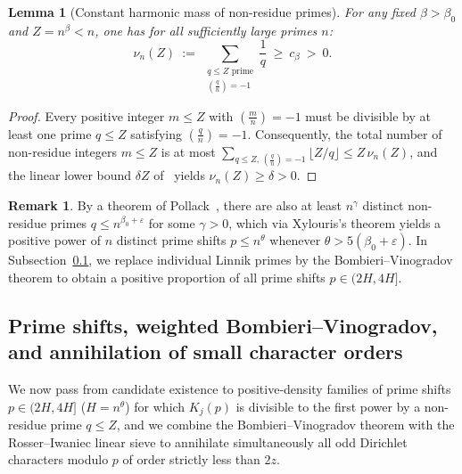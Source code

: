 \documentclass[11pt, a4paper]{article}
\theoremstyle{plain}
\newtheorem{lemma}[theorem]{Lemma}
\theoremstyle{definition}
\newtheorem{remark}[theorem]{Remark}
\newcommand{\leg}[2]{\left(\frac{#1}{#2}\right)}
\begin{document}
\begin{lemma}[Constant harmonic mass of non-residue primes]\label{aud:nu}
For any fixed $\beta>\beta_0$ and $Z=n^{\beta}<n$, one has for all sufficiently large primes $n$:
\[
\nu_n(Z)\ :=\ \sum_{\substack{q\le Z\text{ prime}\\ \leg{q}{n}=-1}}\frac{1}{q}\ \ge\ c_{\beta}\ >\ 0.
\]
\end{lemma}
\begin{proof}
Every positive integer $m\le Z$ with $\leg{m}{n}=-1$ must be divisible by at least one prime $q\le Z$ satisfying $\leg{q}{n}=-1$. Consequently, the total number of non-residue integers $m\le Z$ is at most $\sum_{q\le Z,\,\leg{q}{n}=-1}\lfloor Z/q\rfloor\le Z\,\nu_n(Z)$, and the linear lower bound $\delta Z$ of~\cite{BGHS} yields $\nu_n(Z)\ge\delta>0$.
\end{proof}

\begin{remark}
By a theorem of Pollack~\cite{Pollack}, there are also at least $n^{\gamma}$ distinct non-residue primes $q\le n^{\beta_0+\varepsilon}$ for some $\gamma>0$, which via Xylouris's theorem yields a positive power of $n$ distinct prime shifts $p\le n^{\theta}$ whenever $\theta>5(\beta_0+\varepsilon)$. In Subsection~\ref{aud:sieve}, we replace individual Linnik primes by the Bombieri--Vinogradov theorem to obtain a positive proportion of all prime shifts $p\in(2H,4H]$.
\end{remark}

\subsection{Prime shifts, weighted Bombieri--Vinogradov, and annihilation of small character orders}\label{aud:sieve}

We now pass from candidate existence to positive-density families of prime shifts $p\in(2H,4H]$ ($H=n^{\theta}$) for which $K_j(p)$ is divisible to the first power by a non-residue prime $q\le Z$, and we combine the Bombieri--Vinogradov theorem with the Rosser--Iwaniec linear sieve to annihilate simultaneously all odd Dirichlet characters modulo $p$ of order strictly less than $2z$.
\end{document}
